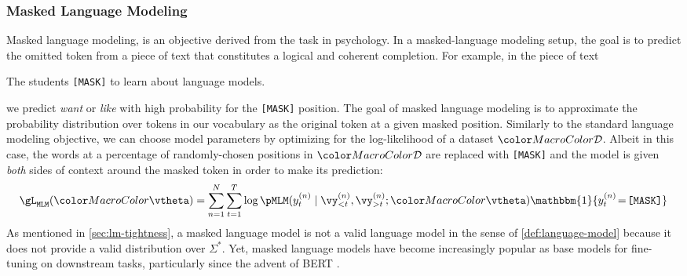 \subsubsection{Masked Language Modeling}
Masked language modeling, is an objective derived from the \citep{cloze} task in psychology. 
In a masked-language modeling setup, the goal is to predict the omitted token from a piece of text that constitutes a logical and coherent completion. For example, in the piece of text
\begin{example}
The students \texttt{[MASK]} to learn about language models.
\end{example}
\noindent we  predict \textit{want} or \textit{like} with high probability for the \texttt{[MASK]} position. The goal of masked language modeling is to approximate the probability distribution over tokens in our vocabulary as the original token at a given masked position. %
Similarly to the standard language modeling objective, we can choose model parameters by optimizing for the log-likelihood of a dataset $\corpus$. Albeit in this case, the words at a percentage of randomly-chosen positions in $\corpus$ are replaced with  \texttt{[MASK]} and the model is given \emph{both} sides of context around the masked token in order to make its prediction: 
\begin{equation}\label{eq:mlm}
    \gL_{\texttt{MLM}}(\modelparams) = \sum_{n=1}^{N}\sum_{t=1}^T \log\pMLM(y_t^{(n)}\mid \vy_{<t}^{(n)}, \vy_{>t}^{(n)}; \modelparams)\mathbbm{1}\{y_t^{(n)}\! = \! \texttt{[MASK]}\}
\end{equation}
As mentioned in \cref{sec:lm-tightness}, a masked language model is not a valid language model in the sense of \cref{def:language-model} because it does not provide a valid distribution over $\Sigma^*$. 
Yet, masked language models have become increasingly popular as base models for fine-tuning on downstream tasks, particularly since the advent of BERT \citep{devlin-etal-2019-bert}.

